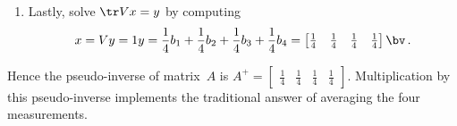 \begin{example}
\begin{enumerate}
\item Lastly, solve \(\tr Vx=y\) by computing 
\begin{equation*}
x=Vy=1y=\h b_1+\h b_2+\h b_3+\h b_4
=\begin{bmatrix} \h&\h&\h&\h \end{bmatrix}\bv\,.
\end{equation*}
\end{enumerate}
\def\h{\frac14}%
Hence the pseudo-inverse of matrix~\(A\) is \(A^+=\begin{bmatrix}  \h&\h&\h&\h\end{bmatrix}\).
Multiplication by this pseudo-inverse implements the traditional answer of averaging the four measurements.
\end{example}







